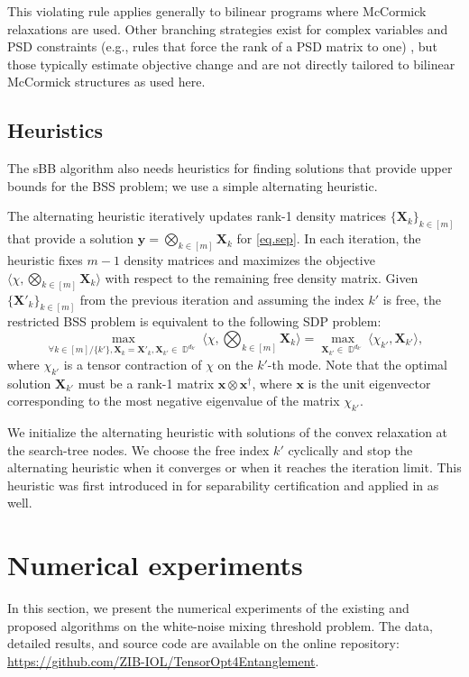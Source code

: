 \documentclass[smallextended]{svjour3}
\DeclareMathOperator{\dmat}{\mathbb{D}}
\newcommand{\X}{\mathbf{X}}
\newcommand{\1}{\mathbf{1}}
\renewcommand{\X}{\mathbf{X}}
\newcommand{\x}{\mathbf{x}}
\newcommand{\y}{\mathbf{y}}
\DeclareMathOperator{\mtens}{\otimes}
\DeclareMathOperator{\bmtens}{\bigotimes}
\newcommand{\inner}[2]{\langle #1, #2 \rangle}
\begin{document}
This violating rule applies generally to bilinear programs where McCormick relaxations are used. Other branching strategies exist for complex variables and PSD constraints (e.g., rules that force the rank of a PSD matrix to one) \cite{chen2017spatial}, but those typically estimate objective change and are not directly tailored to bilinear McCormick structures as used here.

\subsection{Heuristics}

The sBB algorithm also needs heuristics for finding solutions that provide upper bounds for the BSS problem; we use a simple alternating heuristic.

The alternating heuristic iteratively updates rank-1 density matrices $\{\X_k\}_{k \in [m]}$ that provide a solution $\y = \bmtens_{k \in [m]} \X_k$ for \eqref{eq.sep}. In each iteration, the heuristic fixes $m-1$ density matrices and maximizes the objective $\inner{\chi}{\bmtens_{k \in [m]}\X_k}$ with respect to the remaining free density matrix. Given $\{\X'_k\}_{k \in [m]}$ from the previous iteration and assuming the index $k'$ is free, the restricted BSS problem is equivalent to the following SDP problem:
\begin{equation}
     \max_{\forall k \in [m]/ \{k'\}, \X_k = \X'_k, \X_{k'}  \in \dmat^{d_{k'}}} \inner{\chi}{\bmtens_{k \in [m]}\X_k} =  \max_{\X_{k'}  \in \dmat^{d_{k'}}} \inner{\chi_{k'}}{\X_{k'}},
\end{equation}
where $\chi_{k'}$ is a tensor contraction of $\chi$ on the $k'$-th mode.
Note that the optimal solution $\X_{k'}$ must be a rank-1 matrix $\x  \mtens \x^\dagger$, where $\x$ is the unit eigenvector corresponding to the most negative eigenvalue of the matrix $\chi_{k'}$.

We initialize the alternating heuristic with solutions of the convex relaxation at the search-tree nodes. We choose the free index $k'$ cyclically and stop the alternating heuristic when it converges or when it reaches the iteration limit. This heuristic was first introduced in \cite{Shang2018convex} for separability certification and applied in \cite{liu2025unified} as well.

\section{Numerical experiments}
\label{sec.numerical}
In this section, we present the numerical experiments of the existing and proposed algorithms on the white-noise mixing
threshold problem. The data, detailed results, and source code are available on the online repository: \url{https://github.com/ZIB-IOL/TensorOpt4Entanglement}.
\end{document}
